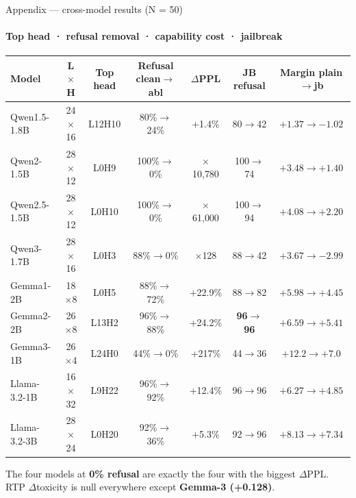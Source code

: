 \documentclass[aspectratio=169]{beamer}
\newcommand{\hl}[1]{\textcolor{themeblue}{\textbf{#1}}}
\begin{document}
\begin{frame}{Appendix --- cross-model results (N = 50)}
  \framesubtitle{Top head · refusal removal · capability cost · jailbreak}
  \scriptsize
  \renewcommand{\arraystretch}{1.12}
  \setlength{\tabcolsep}{4pt}
  \begin{tabular}{@{}l c c c c c c@{}}
    \toprule
    \textbf{Model} & \textbf{L$\times$H} & \textbf{Top head} & \textbf{Refusal clean$\rightarrow$abl} & \textbf{$\Delta$PPL} & \textbf{JB refusal} & \textbf{Margin plain$\rightarrow$jb} \\
    \midrule
    Qwen1.5-1.8B  & 24$\times$16 & L12H10 & 80\%$\rightarrow$24\% & +1.4\%        & 80$\rightarrow$42 & $+1.37\rightarrow\mathbf{-1.02}$ \\
    Qwen2-1.5B    & 28$\times$12 & L0H9   & 100\%$\rightarrow$0\% & $\times$10{,}780 & 100$\rightarrow$74 & $+3.48\rightarrow+1.40$ \\
    Qwen2.5-1.5B  & 28$\times$12 & L0H10  & 100\%$\rightarrow$0\% & $\times$61{,}000 & 100$\rightarrow$94 & $+4.08\rightarrow+2.20$ \\
    Qwen3-1.7B    & 28$\times$16 & L0H3   & 88\%$\rightarrow$0\%  & $\times$128      & 88$\rightarrow$42 & $+3.67\rightarrow\mathbf{-2.99}$ \\
    Gemma1-2B     & 18$\times$8  & L0H5   & 88\%$\rightarrow$72\% & +22.9\%       & 88$\rightarrow$82 & $+5.98\rightarrow+4.45$ \\
    Gemma2-2B     & 26$\times$8  & L13H2  & 96\%$\rightarrow$88\% & +24.2\%       & \textbf{96$\rightarrow$96} & $+6.59\rightarrow+5.41$ \\
    Gemma3-1B     & 26$\times$4  & L24H0  & 44\%$\rightarrow$0\%  & +217\%        & 44$\rightarrow$36 & $+12.2\rightarrow+7.0$ \\
    Llama-3.2-1B  & 16$\times$32 & L9H22  & 96\%$\rightarrow$92\% & +12.4\%       & 96$\rightarrow$96 & $+6.27\rightarrow+4.85$ \\
    Llama-3.2-3B  & 28$\times$24 & L0H20  & 92\%$\rightarrow$36\% & +5.3\%        & 92$\rightarrow$96 & $+8.13\rightarrow+7.34$ \\
    \bottomrule
  \end{tabular}
  \vspace{4pt}\par
  \footnotesize
  The four models at \hl{0\% refusal} are exactly the four with the biggest $\Delta$PPL.
  RTP $\Delta$toxicity is null everywhere except \hl{Gemma-3 (+0.128)}.
\end{frame}
\end{document}
